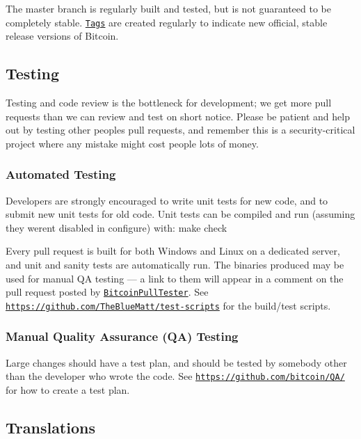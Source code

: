 The {\ttfamily master} branch is regularly built and tested, but is not guaranteed to be completely stable. \href{https://github.com/bitcoin/bitcoin/tags}{\tt Tags} are created regularly to indicate new official, stable release versions of Bitcoin.

\subsection*{Testing }

Testing and code review is the bottleneck for development; we get more pull requests than we can review and test on short notice. Please be patient and help out by testing other people\textquotesingle{}s pull requests, and remember this is a security-\/critical project where any mistake might cost people lots of money.

\subsubsection*{Automated Testing}

Developers are strongly encouraged to write unit tests for new code, and to submit new unit tests for old code. Unit tests can be compiled and run (assuming they weren\textquotesingle{}t disabled in configure) with\+: {\ttfamily make check}

Every pull request is built for both Windows and Linux on a dedicated server, and unit and sanity tests are automatically run. The binaries produced may be used for manual Q\+A testing — a link to them will appear in a comment on the pull request posted by \href{https://github.com/BitcoinPullTester}{\tt Bitcoin\+Pull\+Tester}. See \href{https://github.com/TheBlueMatt/test-scripts}{\tt https\+://github.\+com/\+The\+Blue\+Matt/test-\/scripts} for the build/test scripts.

\subsubsection*{Manual Quality Assurance (Q\+A) Testing}

Large changes should have a test plan, and should be tested by somebody other than the developer who wrote the code. See \href{https://github.com/bitcoin/QA/}{\tt https\+://github.\+com/bitcoin/\+Q\+A/} for how to create a test plan.

\subsection*{Translations }

